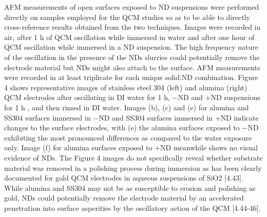 AFM measurements of open surfaces exposed to ND suspensions were performed directly on samples employed for the QCM studies so as to be able to directly cross-reference results obtained from the two techniques. Images were recorded in air, after 1 h of QCM oscillation while immersed in water and after one hour of QCM oscillation while immersed in a ND suspension. The high frequency nature of the oscillation in the presence of the NDs slurries could potentially remove the electrode material but NDs might also attach to the surface. AFM measurements were recorded in at least triplicate for each unique solid:ND combination.
Figure 4 shows representative images of stainless steel 304 (left) and alumina (right) QCM electrodes after oscillating in DI water for 1 h, −ND and +ND suspensions for 1 h , and then rinsed in DI water. Images (b), (c) and (e) for alumina and SS304 surfaces immersed in −ND and SS304 surfaces immersed in +ND indicate changes to the surface electrodes, with (e) the alumina surfaces exposed to −ND exhibiting the most pronounced differences as compared to the water exposure only. Image (f) for alumina surfaces exposed to +ND meanwhile shows no visual evidence of NDs. The Figure 4 images do not specifically reveal whether substrate material was removed in a polishing process during immersion as has been clearly documented for gold QCM electrodes in aqueous suspensions of SiO2 [4.43]. While alumina and SS304 may not be as susceptible to erosion and polishing as gold, NDs could potentially remove the electrode material by an accelerated penetration into surface asperities by the oscillatory action of the QCM [4.44-46].


